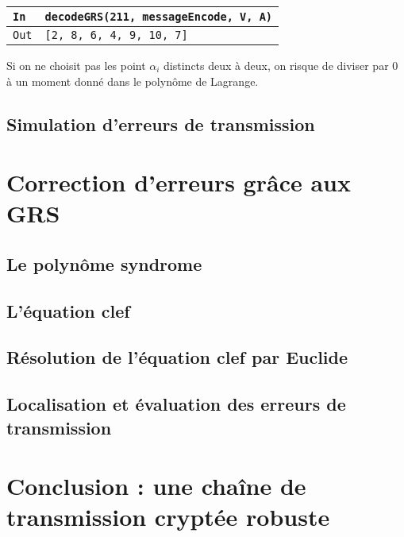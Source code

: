 \documentclass[titlepage]{article}
\begin{document}
        

        \begin{tabularx}{12cm}{|p{0.60cm}|X|}
            \hline
            \rowcolor{gray}
            \texttt{In}
            & 
            \texttt{decodeGRS(211, messageEncode, V, A)}
            \\
            \hline
            \texttt{Out}
            &
            \texttt{[2, 8, 6, 4, 9, 10, 7]}
            \\
            \hline
        \end{tabularx}
        \bigbreak

        Si on ne choisit pas les point $\alpha_i$ distincts deux à deux, on risque de diviser par 0 à un moment donné dans le polynôme de Lagrange.

        \subsection{Simulation d’erreurs de transmission}


    \section{Correction d’erreurs grâce aux GRS}
        \subsection{Le polynôme syndrome}
        \subsection{L’équation clef}
        \subsection{Résolution de l’équation clef par Euclide}
        \subsection{Localisation et évaluation des erreurs de transmission}
    \section{Conclusion : une chaîne de transmission cryptée robuste}
\end{document}
